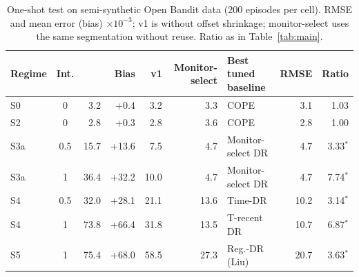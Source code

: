 \begin{table}[t]\centering\scriptsize
\caption{One-shot test on semi-synthetic Open Bandit data (200 episodes per cell). RMSE and mean error (bias) $\times10^{-3}$; v1 is \odrift{} without offset shrinkage; monitor-select uses the same segmentation without reuse. Ratio as in Table~\ref{tab:main}.}
\label{tab:obd}
\begin{tabular}{@{}lcrrrrlrr@{}}\toprule
Regime & Int. & \odrift{} & Bias & v1 & Monitor-select & Best tuned baseline & RMSE & Ratio \\\midrule
S0 & 0 & 3.2 & +0.4 & 3.2 & 3.3 & COPE & 3.1 & 1.03 \\
S2 & 0 & 2.8 & +0.3 & 2.8 & 3.6 & COPE & 2.8 & 1.00 \\
S3a & 0.5 & 15.7 & +13.6 & 7.5 & 4.7 & Monitor-select DR & 4.7 & 3.33$^{*}$ \\
S3a & 1 & 36.4 & +32.2 & 10.0 & 4.7 & Monitor-select DR & 4.7 & 7.74$^{*}$ \\
S4 & 0.5 & 32.0 & +28.1 & 21.1 & 13.6 & Time-DR & 10.2 & 3.14$^{*}$ \\
S4 & 1 & 73.8 & +66.4 & 31.8 & 13.5 & T-recent DR & 10.7 & 6.87$^{*}$ \\
S5 & 1 & 75.4 & +68.0 & 58.5 & 27.3 & Reg.-DR (Liu) & 20.7 & 3.63$^{*}$ \\
\bottomrule\end{tabular}\end{table}
